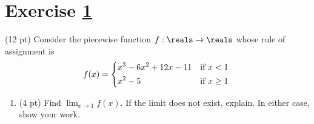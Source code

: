




%
%
%
%


\newpage

\section{Exercise \ref{sec : Math112 Spring2022 MockExam1 Q3}}
\label{sec : Math112 Spring2022 MockExam1 Q3}


(12 pt) Consider the piecewise function $f : \reals \rightarrow \reals$ whose rule of assignment is
\begin{align*}
f(x)
=
\begin{dcases*}
x^{3} - 6 x^{2} + 12 x - 11	&	if $x < 1$	\\
x^{2} - 5				&	if $x \geq 1$
\end{dcases*}
\end{align*}

\begin{enumerate}[label=(\alph*)]
\item\label{itm : ME1Q3a} (4 pt) Find $\displaystyle\lim_{x \rightarrow 1} f(x)$. If the limit does not exist, explain. In either case, show your work.
\end{enumerate}

